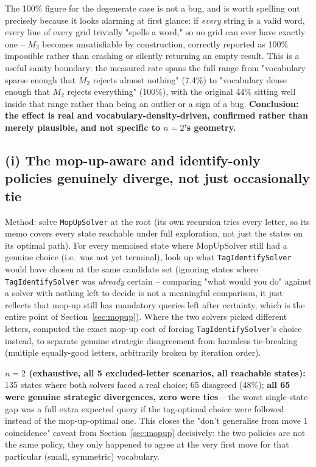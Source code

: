 \documentclass[11pt]{article}
\begin{document}
The 100\% figure for the degenerate case is not a bug, and is worth
spelling out precisely because it looks alarming at first glance: if
\emph{every} string is a valid word, every line of every grid trivially
"spells a word," so no grid can ever have exactly one -- $M_2$ becomes
unsatisfiable by construction, correctly reported as 100\% impossible
rather than crashing or silently returning an empty result. This is a
useful sanity boundary: the measured rate spans the full range from
"vocabulary sparse enough that $M_2$ rejects almost nothing" (7.4\%) to
"vocabulary dense enough that $M_2$ rejects everything" (100\%), with the
original 44\% sitting well inside that range rather than being an
outlier or a sign of a bug. \textbf{Conclusion: the effect is real and
vocabulary-density-driven, confirmed rather than merely plausible, and
not specific to $n=2$'s geometry.}

\subsection{(i) The mop-up-aware and identify-only policies genuinely
diverge, not just occasionally tie}

Method: solve \texttt{MopUpSolver} at the root (its own recursion tries
every letter, so its memo covers every state reachable under full
exploration, not just the states on its optimal path). For every
memoised state where MopUpSolver still had a genuine choice (i.e.\ was
not yet terminal), look up what \texttt{TagIdentifySolver} would have
chosen at the same candidate set (ignoring states where
\texttt{TagIdentifySolver} was \emph{already} certain -- comparing "what
would you do" against a solver with nothing left to decide is not a
meaningful comparison, it just reflects that mop-up still has mandatory
queries left after certainty, which is the entire point of
Section~\ref{sec:mopup}). Where the two solvers picked different letters,
computed the exact mop-up cost of forcing \texttt{TagIdentifySolver}'s
choice instead, to separate genuine strategic disagreement from harmless
tie-breaking (multiple equally-good letters, arbitrarily broken by
iteration order).

\textbf{$n=2$ (exhaustive, all 5 excluded-letter scenarios, all reachable
states):} 135 states where both solvers faced a real choice; 65
disagreed (48\%); \textbf{all 65 were genuine strategic divergences, zero
were ties} -- the worst single-state gap was a full extra expected query
if the tag-optimal choice were followed instead of the mop-up-optimal
one. This closes the "don't generalise from move 1 coincidence" caveat
from Section~\ref{sec:mopup} decisively: the two policies are not the
same policy, they only happened to agree at the very first move for that
particular (small, symmetric) vocabulary.
\end{document}

